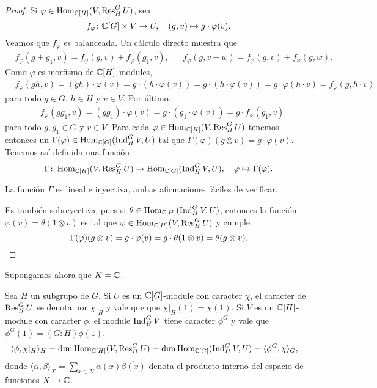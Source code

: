 \begin{proof}
Si $\varphi\in\operatorname{Hom}_{\mathbb{C}[H]}(V,\operatorname{Res}_H^GU)$, sea 
\[
f_{\varphi}\colon \mathbb{C}[G]\times V\to U,
\quad
(g,v)\mapsto g\cdot\varphi(v).
\]
Veamos que $f_{\varphi}$ es balanceada. Un cálculo directo muestra que
\begin{align*}
    &f_{\varphi}(g+g_1,v)=f_{\varphi}(g,v)+f_{\varphi}(g_1,v),&&
    f_{\varphi}(g,v+w)=f_{\varphi}(g,v)+f_{\varphi}(g,w).
\end{align*}
Como $\varphi$ es morfismo de $\mathbb{C}[H]$-modules,
\begin{align*}
    &f_{\varphi}(gh,v)=(gh)\cdot\varphi(v)
    =g\cdot (h\cdot \varphi(v))
    =g\cdot (h\cdot\varphi(v))
    =g\cdot \varphi(h\cdot v)=f_{\varphi}(g,h\cdot v)
\end{align*}
para todo $g\in G$, $h\in H$ y $v\in V$. Por último,
\begin{align*}
    &f_{\varphi}(gg_1,v)=(gg_1)\cdot\varphi(v)=g\cdot(g_1\cdot\varphi(v))=g\cdot f_{\varphi}(g_1,v)
\end{align*}
para todo $g,g_1\in G$ y $v\in V$. Para cada $\varphi\in\operatorname{Hom}_{\mathbb{C}[H]}(V,\operatorname{Res}_H^GU)$ tenemos 
entonces un $\Gamma(\varphi)\in\operatorname{Hom}_{\mathbb{C}[G]}(\operatorname{Ind}_H^GV,U)$ tal que
$\Gamma(\varphi)(g\otimes v)=g\cdot\varphi(v)$. 
Tenemos así definida una función 
\[
\Gamma\colon \operatorname{Hom}_{\mathbb{C}[H]}(V,\operatorname{Res}_H^GU)\to\operatorname{Hom}_{\mathbb{C}[G]}(\operatorname{Ind}_H^GV,U),
\quad
\varphi\mapsto\Gamma(\varphi).
\]

La función $\Gamma$ es lineal e inyectiva, ambas afirmaciones fáciles de verificar. 

Es también sobreyectiva, pues si $\theta\in\operatorname{Hom}_{\mathbb{C}[H]}(\operatorname{Ind}_H^GV,U)$, entonces
la función $\varphi(v)=\theta(1\otimes v)$ es tal que $\varphi\in\operatorname{Hom}_{\mathbb{C}[H]}(V,\operatorname{Res}_H^GU)$ y 
cumple 
\[
\Gamma(\varphi)(g\otimes v)=g\cdot\varphi(v)=g\cdot\theta(1\otimes v)=\theta(g\otimes v).\qedhere
\]
\end{proof}

Supongamos ahora que $K=\mathbb{C}$. 

Sea $H$ un subgrupo de $G$. Si $U$ es un $\mathbb{C}[G]$-module con caracter $\chi$, el caracter de $\operatorname{Res}_H^GU$ se denota por $\chi|_H$ y vale que 
que $\chi|_H(1)=\chi(1)$. Si $V$ es un $\mathbb{C}[H]$-module con 
caracter $\phi$, el module $\operatorname{Ind}_H^GV$ tiene caracter $\phi^G$ y vale que $\phi^G(1)=(G:H)\phi(1)$. 
\begin{align*}
\langle \phi,\chi|_H\rangle_H 
&=\dim\operatorname{Hom}_{\mathbb{C}[H]}(V,\operatorname{Res}_H^GU)
=\dim\operatorname{Hom}_{\mathbb{C}[G]}(\operatorname{Ind}_H^GV,U)
=\langle\phi^G,\chi\rangle_G,
\end{align*}
donde $\langle \alpha,\beta\rangle_X=\sum_{x\in X}\alpha(x)\overline{\beta(x)}$ denota el producto 
interno del espacio de funciones $X\to\mathbb{C}$. 

